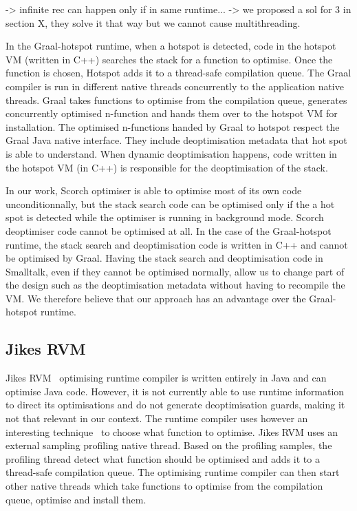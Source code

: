 \documentclass[a4paper,12pt,twoside]{../includes/ThesisStyle}
\begin{document}
-> infinite rec can happen only if in same runtime...
-> we proposed a sol for 3 in section X, they solve it that way but we cannot cause multithreading.

In the Graal-hotspot runtime, when a hotspot is detected, code in the hotspot VM (written in C++) searches the stack for a function to optimise. Once the function is chosen, Hotspot adds it to a thread-safe compilation queue. The Graal compiler is run in different native threads concurrently to the application native threads. Graal takes functions to optimise from the compilation queue, generates concurrently optimised n-function and hands them over to the hotspot VM for installation. The optimised n-functions handed by Graal to hotspot respect the Graal Java native interface. They include deoptimisation metadata that hot spot is able to understand. When dynamic deoptimisation happens, code written in the hotspot VM (in C++) is responsible for the deoptimisation of the stack.

In our work, Scorch optimiser is able to optimise most of its own code unconditionnally, but the stack search code can be optimised only if the a hot spot is detected while the optimiser is running in background mode. Scorch deoptimiser code cannot be optimised at all. In the case of the Graal-hotspot runtime, the stack search and deoptimisation code is written in C++ and cannot be optimised by Graal. Having the stack search and deoptimisation code in Smalltalk, even if they cannot be optimised normally, allow us to change part of the design such as the deoptimisation metadata without having to recompile the VM. We therefore believe that our approach has an advantage over the Graal-hotspot runtime.

\subsection{Jikes RVM}

Jikes RVM~\cite{Alp99a,Arn00} optimising runtime compiler is written entirely in Java and can optimise Java code. However, it is not currently able to use runtime information to direct its optimisations and do not generate deoptimisation guards, making it not that relevant in our context. The runtime compiler uses however an interesting technique~\cite{Arn00} to choose what function to optimise. Jikes RVM uses an external sampling profiling native thread. Based on the profiling samples, the profiling thread detect what function should be optimised and adds it to a thread-safe compilation queue. The optimising runtime compiler can then start other native threads which take functions to optimise from the compilation queue, optimise and install them. 
\end{document}
